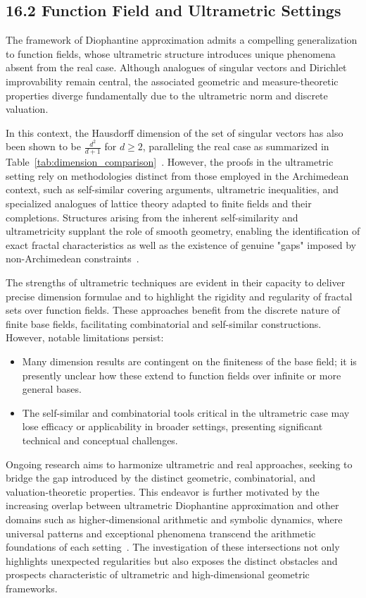 \documentclass[11pt]{article}
\begin{document}
\subsection{16.2 Function Field and Ultrametric Settings}

The framework of Diophantine approximation admits a compelling generalization to function fields, whose ultrametric structure introduces unique phenomena absent from the real case. Although analogues of singular vectors and Dirichlet improvability remain central, the associated geometric and measure-theoretic properties diverge fundamentally due to the ultrametric norm and discrete valuation.

In this context, the Hausdorff dimension of the set of singular vectors has also been shown to be $\frac{d^2}{d+1}$ for $d \geq 2$, paralleling the real case as summarized in Table~\ref{tab:dimension_comparison}~\cite{ref79}. However, the proofs in the ultrametric setting rely on methodologies distinct from those employed in the Archimedean context, such as self-similar covering arguments, ultrametric inequalities, and specialized analogues of lattice theory adapted to finite fields and their completions. Structures arising from the inherent self-similarity and ultrametricity supplant the role of smooth geometry, enabling the identification of exact fractal characteristics as well as the existence of genuine "gaps" imposed by non-Archimedean constraints~\cite{ref79}.

The strengths of ultrametric techniques are evident in their capacity to deliver precise dimension formulae and to highlight the rigidity and regularity of fractal sets over function fields. These approaches benefit from the discrete nature of finite base fields, facilitating combinatorial and self-similar constructions. However, notable limitations persist:

\begin{itemize}
    \item Many dimension results are contingent on the finiteness of the base field; it is presently unclear how these extend to function fields over infinite or more general bases.
    \item The self-similar and combinatorial tools critical in the ultrametric case may lose efficacy or applicability in broader settings, presenting significant technical and conceptual challenges.
\end{itemize}

Ongoing research aims to harmonize ultrametric and real approaches, seeking to bridge the gap introduced by the distinct geometric, combinatorial, and valuation-theoretic properties. This endeavor is further motivated by the increasing overlap between ultrametric Diophantine approximation and other domains such as higher-dimensional arithmetic and symbolic dynamics, where universal patterns and exceptional phenomena transcend the arithmetic foundations of each setting~\cite{ref79,ref109}. The investigation of these intersections not only highlights unexpected regularities but also exposes the distinct obstacles and prospects characteristic of ultrametric and high-dimensional geometric frameworks.
\end{document}
